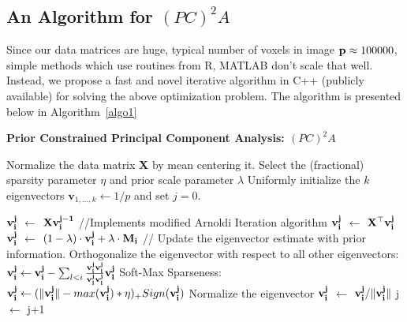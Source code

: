 \documentclass{llncs}
\newcommand{\bs}{\boldsymbol}
\begin{document}
\subsection{An Algorithm for $(PC)^2A$}
Since our data matrices are huge, typical number of voxels in image ${\bf p}\approx 100000$, simple methods which use routines from R, MATLAB don't scale that well. Instead, we propose a fast and novel iterative algorithm in C++ (publicly available) for solving the above optimization problem. The algorithm is presented below in Algorithm~\ref{algo1}


\begin{algorithm}[htdp]
\small \caption{\bf Prior Constrained Principal Component Analysis: $(PC)^2A$}
\label{algo1}
\begin{algorithmic}[1]
\STATE Normalize the data matrix {\bf X} by  mean centering it.
\STATE Select the (fractional) sparsity parameter $\eta$ and prior scale parameter $\lambda$
\STATE Uniformly initialize the $k$ eigenvectors $\bs v_{1,\ldots, k} \gets 1/p$ and set $j=0$.

\STATE ${\bf v_i^{j}}$ $\gets$ ${\bf Xv_i^{j-1}}$ //Implements modified Arnoldi Iteration algorithm
\STATE ${\bf v_i^{j}}$ $\gets$ ${\bf X^{\top}v_i^{j}}$
\STATE ${\bf v_i^{j}}$ $\gets$ $(1-\lambda)\cdot {\bf v_i^{j}} + \lambda\cdot \bf M_i$ // Update the eigenvector estimate with prior information.
\STATE Orthogonalize the eigenvector with respect to all other eigenvectors:\\ ${\bf v_i^{j}} \gets {\bf v_i^{j}} - \sum_{l <i} \frac{\bf v_i^{j} \bf v_l^{j}}{\bf v_l^{j} \bf v_l^{j}}  \bf v_l^{j}$
\STATE Soft-Max Sparseness:  ${\bf v_i^{j}}  \leftarrow (\|{\bf v_i^{j}}\|  - max({\bf v_i^{j}})*\eta)_+ Sign({\bf v_i^{j}})$
\STATE Normalize the eigenvector ${\bf v_i^{j}}$ $\gets$ ${\bf v_i^{j}}/\|{\bf v_i^{j}}\|$
\STATE j $\leftarrow$ j+1
\ENDFOR
\ENDWHILE
\end{algorithmic}
\end{algorithm}




\end{document}
